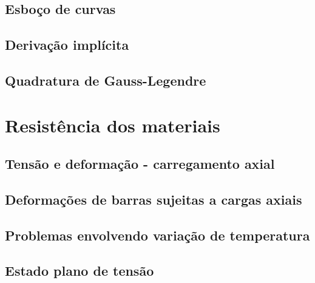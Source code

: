 \documentclass[12pt, a4paper]{article}
\begin{document}
		\subsection{Esboço de curvas}
		
		
		\subsection{Derivação implícita}
		
		
		
		\subsection{Quadratura de Gauss-Legendre}
		
		
	\section{Resistência dos materiais}
		\subsection{Tensão e deformação - carregamento axial}
		
		
		\subsection{Deformações de barras sujeitas a cargas axiais}		
		
		
		\subsection{Problemas envolvendo variação de temperatura}
			
		
		\subsection{Estado plano de tensão}
		
		
\end{document}
